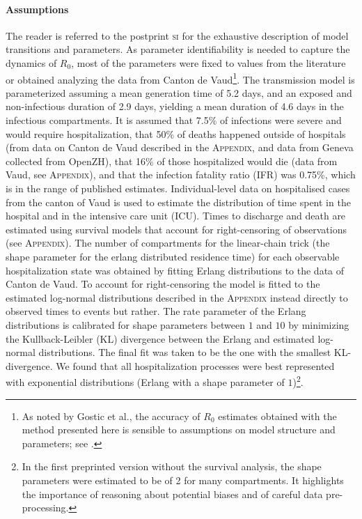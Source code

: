 \paragraph{Assumptions} The reader is referred to the postprint \textsc{si} for the exhaustive description of model transitions and parameters. As parameter identifiability is needed to capture the dynamics of $R_0$, most of the parameters were fixed to values from the literature or obtained analyzing the data from Canton de Vaud\footnote[][-3\baselineskip]{As noted by Gostic et al., the accuracy of $R_0$ estimates obtained with the method presented here is sensible to assumptions on model structure and parameters; see .}.
The transmission model is parameterized assuming a mean generation time of 5.2 days\cite{Ganyani:EstimatingGenerationInterval:2020}, and an exposed and non-infectious duration of 2.9 days\cite{He:TemporalDynamicsViral:2020}, yielding a mean duration of 4.6 days in the infectious compartments.  It is assumed that 7.5\% of infections were severe and would require hospitalization, that 50\% of deaths happened outside of hospitals (from data on Canton de Vaud described in the \textsc{Appendix}, and data from Geneva collected from OpenZH), that 16\% of those hospitalized would die (data from Vaud, see \textsc{Appendix}), and that the infection fatality ratio (IFR) was 0.75\%, which is in the range of published estimates\cite{Verity:EstimatesSeverityCoronavirus:2020, Russell:EstimatingInfectionCase:2020}. Individual-level data on hospitalised cases from the canton of Vaud is used to estimate the distribution of time spent in the hospital and in the intensive care unit (ICU). Times to discharge and death are estimated using survival models that account for right-censoring of observations (see \textsc{Appendix}). The number of compartments for the linear-chain trick (\ie the shape parameter for the erlang distributed residence time) for each observable hospitalization state was obtained by fitting Erlang distributions to the data of Canton de Vaud. To account for right-censoring the model is fitted to the estimated log-normal distributions described in the \textsc{Appendix} instead directly to observed times to events but rather. The rate parameter of the Erlang distributions is calibrated for shape parameters between $1$ and $10$ by minimizing the Kullback-Leibler (KL) divergence between the Erlang and estimated log-normal distributions. The final fit was taken to be the one with the smallest KL-divergence. We found that all hospitalization processes were best represented with exponential distributions (Erlang with a shape parameter of $1$)\footnote{In the first preprinted version without the survival analysis, the shape parameters were estimated to be of 2 for many compartments. It highlights the importance of reasoning about potential biases and of careful data pre-processing.}.

